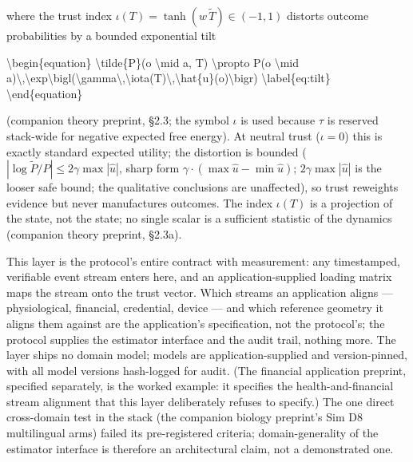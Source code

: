 \documentclass[
]{article}
\newenvironment{Shaded}{}{}
\newcommand{\NormalTok}[1]{#1}
\begin{document}
\begin{itemize}
  where the trust index \(\iota(T) = \tanh(w\,\tilde{T}) \in (-1, 1)\)
  distorts outcome probabilities by a bounded exponential tilt

\begin{Shaded}
\begin{Highlighting}[]
\NormalTok{\textbackslash{}begin\{equation\}}
\NormalTok{ \textbackslash{}tilde\{P\}(o \textbackslash{}mid a, T) \textbackslash{}propto P(o \textbackslash{}mid a)\textbackslash{},\textbackslash{}exp\textbackslash{}bigl(\textbackslash{}gamma\textbackslash{},\textbackslash{}iota(T)\textbackslash{},\textbackslash{}hat\{u\}(o)\textbackslash{}bigr) \textbackslash{}label\{eq:tilt\}}
\NormalTok{\textbackslash{}end\{equation\}}
\end{Highlighting}
\end{Shaded}

  (companion theory preprint, §2.3; the symbol \(\iota\) is used because
  \(\tau\) is reserved stack-wide for negative expected free energy). At
  neutral trust (\(\iota = 0\)) this is exactly standard expected
  utility; the distortion is bounded
  (\(|\log \tilde{P}/P| \leq 2\gamma \max|\hat{u}|\), sharp form
  \(\gamma\cdot(\max\hat{u} - \min\hat{u})\); \(2\gamma \max|\hat{u}|\)
  is the looser safe bound; the qualitative conclusions are unaffected),
  so trust reweights evidence but never manufactures outcomes. The index
  \(\iota(T)\) is a projection of the state, not the state; no single
  scalar is a sufficient statistic of the dynamics (companion theory
  preprint, §2.3a).
\end{itemize}

This layer is the protocol's entire contract with measurement: any
timestamped, verifiable event stream enters here, and an
application-supplied loading matrix maps the stream onto the trust
vector. Which streams an application aligns --- physiological,
financial, credential, device --- and which reference geometry it aligns
them against are the application's specification, not the protocol's;
the protocol supplies the estimator interface and the audit trail,
nothing more. The layer ships no domain model; models are
application-supplied and version-pinned, with all model versions
hash-logged for audit. (The financial application preprint, specified
separately, is the worked example: it specifies the health-and-financial
stream alignment that this layer deliberately refuses to specify.) The
one direct cross-domain test in the stack (the companion biology
preprint's Sim D8 multilingual arms) failed its pre-registered criteria;
domain-generality of the estimator interface is therefore an
architectural claim, not a demonstrated one.
\end{document}
